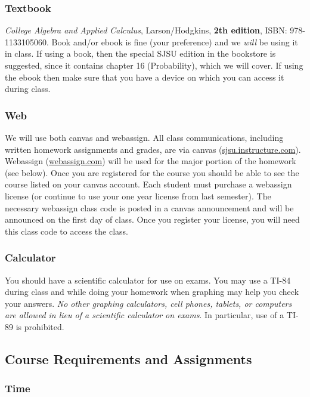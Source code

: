 \documentclass[letterpaper,12pt,fleqn]{article}
\begin{document}
\subsubsection*{Textbook}

\emph{College Algebra and Applied Calculus}, Larson/Hodgkins, \textbf{2th edition}, ISBN: 978-1133105060. Book and/or ebook is
fine (your preference) and we \emph{will} be using it in class.  If using a book, then the special SJSU edition in the
bookstore is suggested, since it contains chapter 16 (Probability), which we will cover.  If using the ebook then make sure
that you have a device on which you can access it during class.

\subsubsection*{Web}

We will use both canvas and webassign. All class communications, including written homework assignments and grades, are via
canvas (\url{sjsu.instructure.com}).  Webassign (\url{webassign.com}) will be used for the major portion of the
homework (see below).  Once you are registered for the course you should be able to see the course listed on your canvas
account.  Each student must purchase a webassign license (or continue to use your one year license from last semester). The
necessary webassign class code is posted in a canvas announcement and will be announced on the first day of class. Once you
register your license, you will need this class code to access the class.

\subsubsection*{Calculator}

You should have a scientific calculator for use on exams.  You may use a TI-84 during class and while doing your homework when
graphing may help you check your answers.  \emph{No other graphing calculators, cell phones, tablets, or computers are allowed
  in lieu of a scientific calculator on exams}.  In particular, use of a TI-89 is prohibited.

\subsection*{Course Requirements and Assignments}

\subsubsection*{Time}
\end{document}

